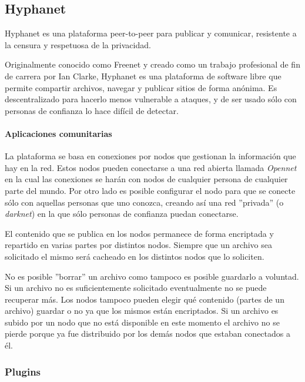 \subsection{Hyphanet}

Hyphanet \cite{hyphanet-white-paper}\cite{hyphanet} es una plataforma peer-to-peer para publicar y comunicar, resistente a la censura y respetuosa de la privacidad.

Originalmente conocido como Freenet y creado como un trabajo profesional de fin de carrera por Ian Clarke, Hyphanet es una plataforma de software libre que permite compartir archivos, navegar y publicar sitios de forma anónima. Es descentralizado para hacerlo menos vulnerable a ataques, y de ser usado sólo con personas de confianza lo hace difícil de detectar.

\paragraph{Aplicaciones comunitarias}

La plataforma se basa en conexiones por nodos que gestionan la información que hay en la red. Estos nodos pueden conectarse a una red abierta llamada \textit{Opennet} en la cual las conexiones se harán con nodos de cualquier persona de cualquier parte del mundo. Por otro lado es posible configurar el nodo para que se conecte sólo con aquellas personas que uno conozca, creando así una red ''privada'' (o \textit{darknet}) en la que sólo personas de confianza puedan conectarse.

El contenido que se publica en los nodos permanece de forma encriptada y repartido en varias partes por distintos nodos. Siempre que un archivo sea solicitado el mismo será cacheado en los distintos nodos que lo soliciten.

No es posible ''borrar'' un archivo como tampoco es posible guardarlo a voluntad. Si un archivo no es suficientemente solicitado eventualmente no se puede recuperar más. Los nodos tampoco pueden elegir qué contenido (partes de un archivo) guardar o no ya que los mismos están encriptados. Si un archivo es subido por un nodo que no está disponible en este momento el archivo no se pierde porque ya fue distribuido por los demás nodos que estaban conectados a él.


\subsubsection{Plugins}

